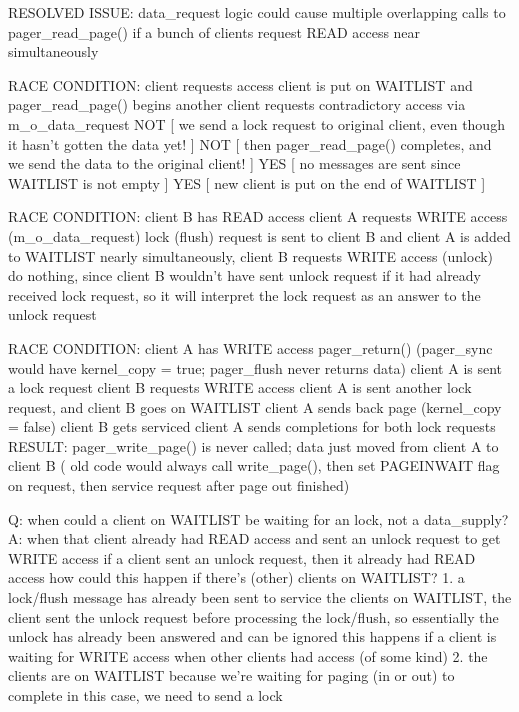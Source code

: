 \documentclass{article}
\begin{document}
RESOLVED ISSUE:
  data_request logic could cause multiple overlapping calls to pager_read_page() if a bunch of clients
    request READ access near simultaneously

RACE CONDITION:
  client requests access
  client is put on WAITLIST and pager_read_page() begins
  another client requests contradictory access via m_o_data_request
  NOT [ we send a lock request to original client, even though it hasn't gotten the data yet! ]
  NOT [ then pager_read_page() completes, and we send the data to the original client! ]
  YES [ no messages are sent since WAITLIST is not empty ]
  YES [ new client is put on the end of WAITLIST ]

RACE CONDITION:
  client B has READ access
  client A requests WRITE access (m_o_data_request)
  lock (flush) request is sent to client B and client A is added to WAITLIST
  nearly simultaneously, client B requests WRITE access (unlock)
  do nothing, since client B wouldn't have sent unlock request if it had already received lock request,
    so it will interpret the lock request as an answer to the unlock request

RACE CONDITION:
  client A has WRITE access
  pager_return()  (pager_sync would have kernel_copy = true; pager_flush never returns data)
  client A is sent a lock request
  client B requests WRITE access
  client A is sent another lock request, and client B goes on WAITLIST
  client A sends back page (kernel_copy = false)
  client B gets serviced
  client A sends completions for both lock requests
  RESULT: pager_write_page() is never called; data just moved from client A to client B
  ( old code would always call write_page(), then set PAGEINWAIT flag on request, then service request after page out finished)


Q: when could a client on WAITLIST be waiting for an lock, not a data_supply?
A: when that client already had READ access and sent an unlock request to get WRITE access
  if a client sent an unlock request, then it already had READ access
  how could this happen if there's (other) clients on WAITLIST?
  1. a lock/flush message has already been sent to service the clients on WAITLIST,
       the client sent the unlock request before processing the lock/flush,
       so essentially the unlock has already been answered and can be ignored
     this happens if a client is waiting for WRITE access when other clients had access (of some kind)
  2. the clients are on WAITLIST because we're waiting for paging (in or out) to complete
     in this case, we need to send a lock
\end{document}

